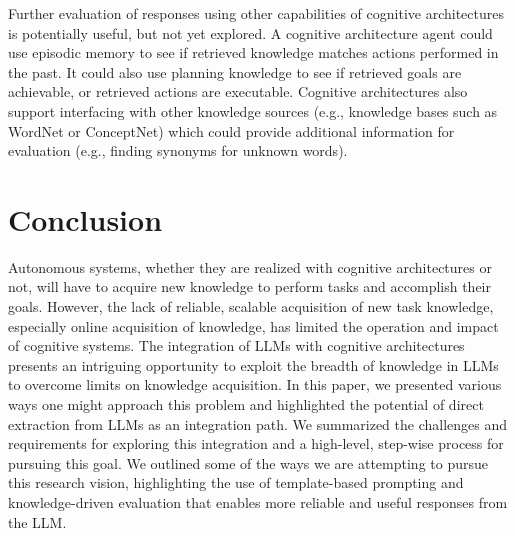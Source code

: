 \documentclass[letterpaper]{article} %
\begin{document}
\vspace{-3.42mm}
Further evaluation of responses using other capabilities of cognitive architectures is potentially useful, but not yet explored. A cognitive architecture agent could use episodic memory to see if retrieved knowledge matches actions performed in the past. It could also use planning knowledge to see if retrieved goals are achievable, or retrieved actions are executable. Cognitive architectures also support interfacing with other knowledge sources (e.g., knowledge bases such as WordNet or ConceptNet) which could provide additional information for evaluation (e.g., finding synonyms for unknown words).


\vspace{-3.57mm}
\section{Conclusion}

Autonomous systems, whether they are realized with cognitive architectures or not, will have to acquire new knowledge to perform tasks and accomplish their goals.
However, the lack of reliable, scalable acquisition of new task knowledge, especially online acquisition of knowledge, has limited the operation and impact of cognitive systems. The integration of LLMs with cognitive architectures presents an intriguing opportunity to exploit the breadth of knowledge in LLMs to overcome limits on knowledge acquisition.  In this paper, we presented various ways one might approach this problem and highlighted the potential of direct extraction from LLMs as an integration path. We summarized the challenges and requirements for exploring this integration and a high-level, step-wise process for pursuing this goal. We outlined some of the ways we are attempting to pursue this research vision, highlighting the use of template-based prompting and knowledge-driven evaluation that enables more reliable and useful responses from the LLM.
\end{document}
